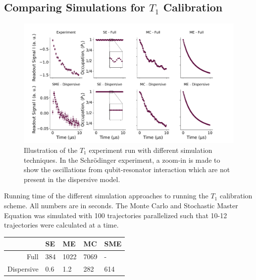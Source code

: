 \subsection{Comparing Simulations for $T_1$ Calibration}
\begin{figure}[t]
    \centering
    \includegraphics[]{Simulations/simulations_of_calibrations/Figs/qubit_T1_dispersive.pdf}
    \caption{Illustration of the $T_1$ experiment run with different simulation techniques. In the Schrödinger experiment, a zoom-in is made to show the oscillations from qubit-resonator interaction which are not present in the dispersive model. }
    \label{fig:calibrations_in_simulation}
\end{figure}
\begin{margintable}[2 cm]
    \caption{Running time of the different simulation approaches to running the $T_1$ calibration scheme. All numbers are in seconds. The Monte Carlo and Stochastic Master Equation was simulated with 100 trajectories parallelized such that 10-12 trajectories were calculated at a time.}
    \vspace{0.3 cm}
    \centering
    \begin{tabular}{r|llll}
                    &  SE   & ME    & MC    & SME   \\ \hline 
    Full            & 384   & 1022  & 7069  & -     \\
    Dispersive      & 0.6   & 1.2   & 282     & 614     \\ 
    \end{tabular}
    \label{tab:simulation_t1_running_time}
\end{margintable}

